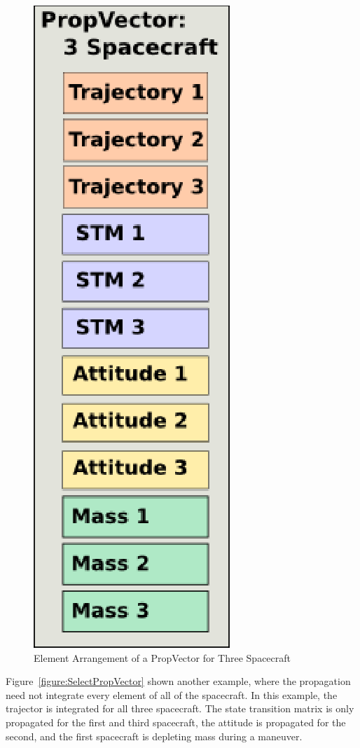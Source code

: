 \begin{figure}[htb]
\begin{center}
\includegraphics[scale=0.5]{Images/ThreeSatPropVector.eps}
\caption{\label{figure:ThreeSatPropVector}Element Arrangement of a PropVector for Three
Spacecraft}
\end{center}
\end{figure}

Figure~\ref{figure:SelectPropVector} shown another example, where the propagation need not
integrate every element of all of the spacecraft.  In this example, the trajector is integrated for
all three spacecraft.  The state transition matrix is only propagated for the first and third
spacecraft, the attitude is propagated for the second, and the first spacecraft is depleting mass
during a maneuver.

